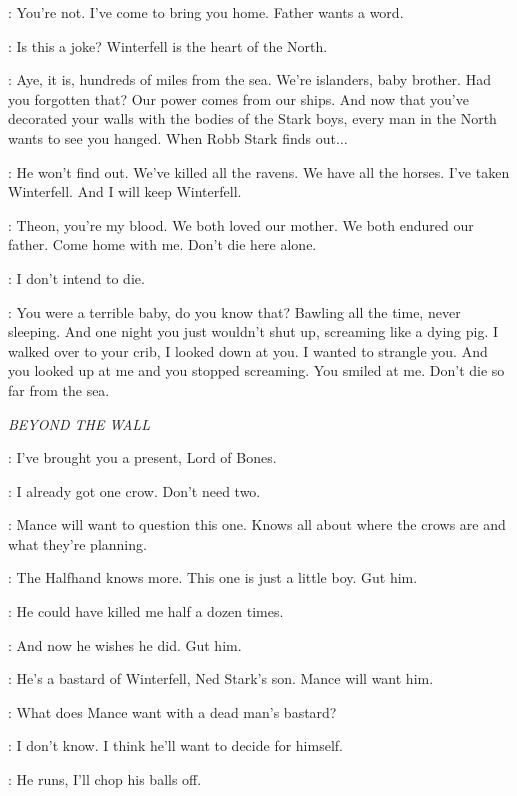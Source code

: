 \YARA: You're not. I've come to bring you home. Father wants a word. 

\THEON: Is this a joke? Winterfell is the heart of the North. 

\YARA: Aye, it is, hundreds of miles from the sea. We're islanders, baby brother. Had you forgotten that? Our power comes from our ships. And now that you've decorated your walls with the bodies of the Stark boys, every man in the North wants to see you hanged. When Robb Stark finds out$\ldots$  

\THEON: He won't find out. We've killed all the ravens. We have all the horses. I've taken Winterfell. And I will keep Winterfell. 

\YARA: Theon, you're my blood. We both loved our mother. We both endured our father. Come home with me. Don't die here alone. 

\THEON: I don't intend to die. 

\YARA: You were a terrible baby, do you know that? Bawling all the time, never sleeping. And one night you just wouldn't shut up, screaming like a dying pig. I walked over to your crib, I looked down at you. I wanted to strangle you. And you looked up at me and you stopped screaming. You smiled at me. Don't die so far from the sea. 


\scene

\textit{BEYOND THE WALL} 


\YGRITTE: I've brought you a present, Lord of Bones. 

\LORDOFBONES: I already got one crow. Don't need two. 

\YGRITTE: Mance will want to question this one. Knows all about where the crows are and what they're planning. 

\LORDOFBONES: The Halfhand knows more. This one is just a little boy. Gut him. 

\YGRITTE: He could have killed me half a dozen times. 

\LORDOFBONES: And now he wishes he did. Gut him. 

\YGRITTE: He's a bastard of Winterfell, Ned Stark's son. Mance will want him. 

\LORDOFBONES: What does Mance want with a dead man's bastard? 

\YGRITTE: I don't know. I think he'll want to decide for himself. 

\LORDOFBONES: He runs, I'll chop his balls off. 

